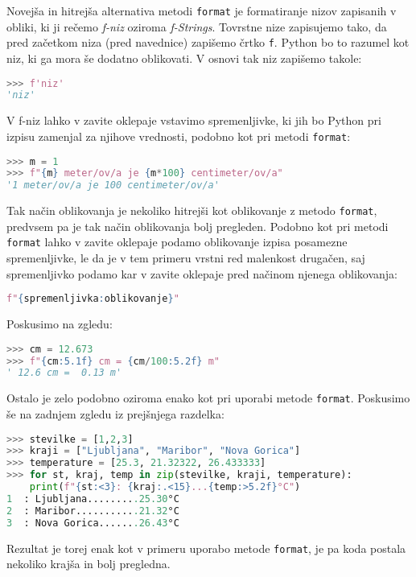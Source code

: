 Novejša in hitrejša alternativa metodi \texttt{format} je formatiranje nizov zapisanih v obliki, ki ji rečemo \emph{f-niz} oziroma \emph{f-Strings}. Tovrstne nize zapisujemo tako, da pred začetkom niza (pred navednice) zapišemo črtko \texttt{f}. Python bo to razumel kot niz, ki ga mora še dodatno oblikovati. V osnovi tak niz zapišemo takole:
\begin{lstlisting}[language=Python]
>>> f'niz'
'niz'
\end{lstlisting}
V f-niz lahko v zavite oklepaje vstavimo spremenljivke, ki jih bo Python pri izpisu zamenjal za njihove vrednosti, podobno kot pri metodi \texttt{format}:
\begin{lstlisting}[language=Python]
>>> m = 1
>>> f"{m} meter/ov/a je {m*100} centimeter/ov/a"
'1 meter/ov/a je 100 centimeter/ov/a'
\end{lstlisting}
Tak način oblikovanja je nekoliko hitrejši kot oblikovanje z metodo \texttt{format}, predvsem pa je tak način oblikovanja bolj pregleden. Podobno kot pri metodi \texttt{format} lahko v zavite oklepaje podamo oblikovanje izpisa posamezne spremenljivke, le da je v tem primeru vrstni red malenkost drugačen, saj spremenljivko podamo kar v zavite oklepaje pred načinom njenega oblikovanja:
\begin{lstlisting}[language=Python]
f"{spremenljivka:oblikovanje}"
\end{lstlisting}
Poskusimo na zgledu:
\begin{lstlisting}[language=Python]
>>> cm = 12.673
>>> f"{cm:5.1f} cm = {cm/100:5.2f} m"
' 12.6 cm =  0.13 m'
\end{lstlisting}
Ostalo je zelo podobno oziroma enako kot pri uporabi metode \texttt{format}. Poskusimo še na zadnjem zgledu iz prejšnjega razdelka:
\begin{lstlisting}[language=Python]
>>> stevilke = [1,2,3]
>>> kraji = ["Ljubljana", "Maribor", "Nova Gorica"]
>>> temperature = [25.3, 21.32322, 26.433333]
>>> for st, kraj, temp in zip(stevilke, kraji, temperature):
	print(f"{st:<3}: {kraj:.<15}...{temp:>5.2f}°C")
1  : Ljubljana.........25.30°C
2  : Maribor...........21.32°C
3  : Nova Gorica.......26.43°C
\end{lstlisting}
Rezultat je torej enak kot v primeru uporabo metode \texttt{format}, je pa koda postala nekoliko krajša in bolj pregledna.